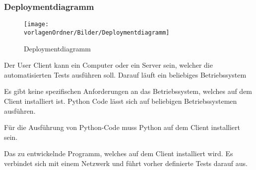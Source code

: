 \documentclass[]{subfiles}
\begin{document}
		\subsubsection{Deploymentdiagramm}
		\begin{figure}[h!]
			\begin{center}
				\texttt{[image: \\vorlagenOrdner/Bilder/Deploymentdiagramm]}
			\end{center}
		\caption{Deploymentdiagramm}	
		\end{figure}
	
		Der User Client kann ein Computer oder ein Server sein, welcher die automatisierten Tests ausführen soll.
		Darauf läuft ein beliebiges Betriebssystem

		Es gibt keine spezifischen Anforderungen an das Betriebssystem, welches auf dem Client installiert ist.
		Python Code lässt sich auf beliebigen Betriebssystemen ausführen.

		Für die Ausführung von Python-Code muss Python auf dem Client installiert sein. 

		Das zu entwickelnde Programm, welches auf dem Client installiert wird. 
		Es verbindet sich mit einem Netzwerk und führt vorher definierte Tests darauf aus.

    
\end{document}
